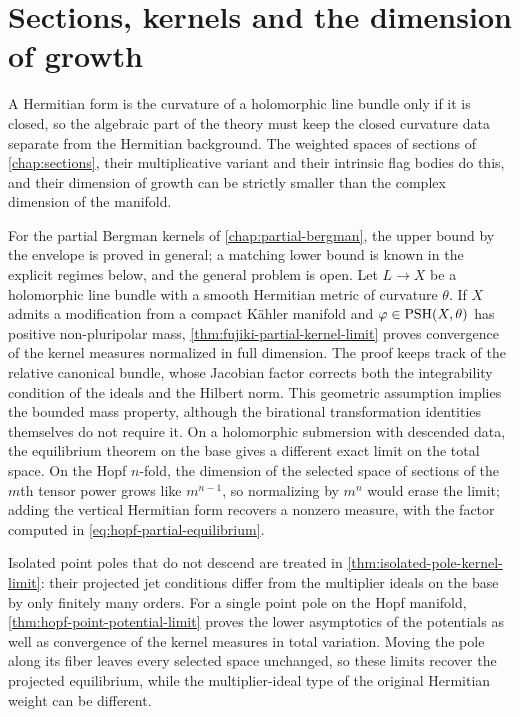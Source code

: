 \section{Sections, kernels and the dimension of growth}

A Hermitian form is the curvature of a holomorphic line bundle only if it is closed, so the algebraic part of the theory must keep the closed curvature data separate from the Hermitian background. The weighted spaces of sections of \cref{chap:sections}, their multiplicative variant and their intrinsic flag bodies do this, and their dimension of growth can be strictly smaller than the complex dimension of the manifold.

For the partial Bergman kernels of \cref{chap:partial-bergman}, the upper bound by the envelope is proved in general; a matching lower bound is known in the explicit regimes below, and the general problem is open. Let $L\to X$ be a holomorphic line bundle with a smooth Hermitian metric of curvature $\theta$. If $X$ admits a modification from a compact K\"ahler manifold and $\varphi\in\mathrm{PSH}(X,\theta)$ has positive non-pluripolar mass, \cref{thm:fujiki-partial-kernel-limit} proves convergence of the kernel measures normalized in full dimension. The proof keeps track of the relative canonical bundle, whose Jacobian factor corrects both the integrability condition of the ideals and the Hilbert norm. This geometric assumption implies the bounded mass property, although the birational transformation identities themselves do not require it. On a holomorphic submersion with descended data, the equilibrium theorem on the base gives a different exact limit on the total space. On the Hopf $n$-fold, the dimension of the selected space of sections of the $m$th tensor power grows like $m^{n-1}$, so normalizing by $m^n$ would erase the limit; adding the vertical Hermitian form recovers a nonzero measure, with the factor computed in \eqref{eq:hopf-partial-equilibrium}.

Isolated point poles that do not descend are treated in \cref{thm:isolated-pole-kernel-limit}: their projected jet conditions differ from the multiplier ideals on the base by only finitely many orders. For a single point pole on the Hopf manifold, \cref{thm:hopf-point-potential-limit} proves the lower asymptotics of the potentials as well as convergence of the kernel measures in total variation. Moving the pole along its fiber leaves every selected space unchanged, so these limits recover the projected equilibrium, while the multiplier-ideal type of the original Hermitian weight can be different.

